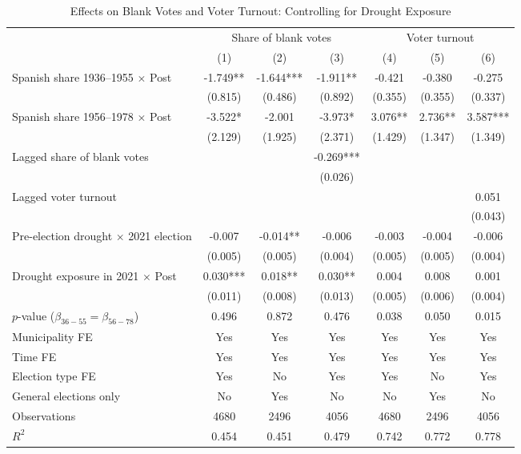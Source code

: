 \begin{table}[!htbp]
\caption{Effects on Blank Votes and Voter Turnout: Controlling for Drought Exposure}
\centering
\scriptsize
\renewcommand{\arraystretch}{1.15}
\setlength{\tabcolsep}{3pt}
\begin{tabular}{p{}cccccc}
\hline
 & \multicolumn{3}{c}{Share of blank votes} & \multicolumn{3}{c}{Voter turnout} \\
\cline{2-4}\cline{5-7}
 & (1) & (2) & (3) & (4) & (5) & (6) \\
\hline
Spanish share 1936--1955 $\times$ Post & -1.749** & -1.644*** & -1.911** & -0.421 & -0.380 & -0.275 \\
 & (0.815) & (0.486) & (0.892) & (0.355) & (0.355) & (0.337) \\
Spanish share 1956--1978 $\times$ Post & -3.522* & -2.001 & -3.973* & 3.076** & 2.736** & 3.587*** \\
 & (2.129) & (1.925) & (2.371) & (1.429) & (1.347) & (1.349) \\
Lagged share of blank votes &  &  & -0.269*** &  &  &  \\
 &  &  & (0.026) &  &  &  \\
Lagged voter turnout &  &  &  &  &  & 0.051 \\
 &  &  &  &  &  & (0.043) \\
Pre-election drought $\times$ 2021 election & -0.007 & -0.014** & -0.006 & -0.003 & -0.004 & -0.006 \\
 & (0.005) & (0.005) & (0.004) & (0.005) & (0.005) & (0.004) \\
Drought exposure in 2021 $\times$ Post & 0.030*** & 0.018** & 0.030** & 0.004 & 0.008 & 0.001 \\
 & (0.011) & (0.008) & (0.013) & (0.005) & (0.006) & (0.004) \\
$p$-value ($\beta_{36{-}55}=\beta_{56{-}78}$) & 0.496 & 0.872 & 0.476 & 0.038 & 0.050 & 0.015 \\
Municipality FE & Yes & Yes & Yes & Yes & Yes & Yes \\
Time FE & Yes & Yes & Yes & Yes & Yes & Yes \\
Election type FE & Yes & No & Yes & Yes & No & Yes \\
General elections only & No & Yes & No & No & Yes & No \\

Observations & 4680 & 2496 & 4056 & 4680 & 2496 & 4056 \\
$R^2$ & 0.454 & 0.451 & 0.479 & 0.742 & 0.772 & 0.778 \\
\hline
\end{tabular}


\end{table}
